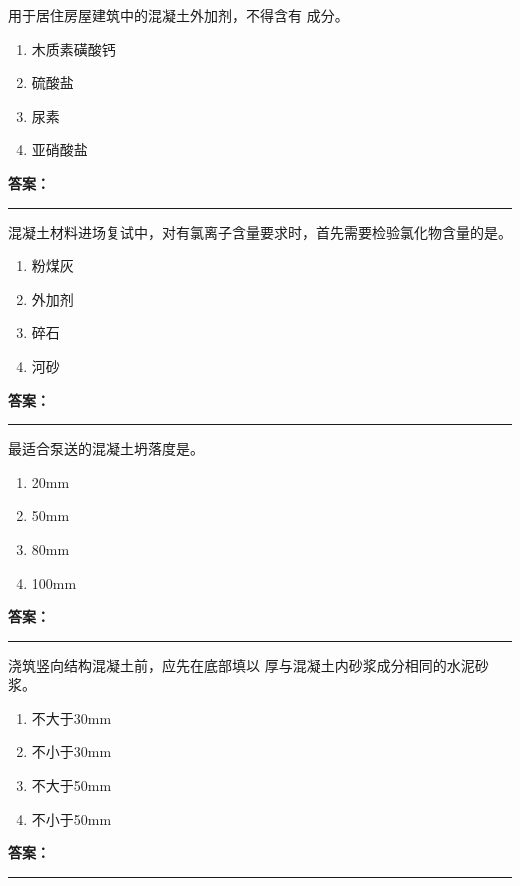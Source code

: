 \documentclass[UTF8,fontset=fandol,11pt]{ctexart}
\newcommand{\answerline}{\textcolor{answerred}{\rule{2.4cm}{0.7pt}}}
\begin{document}
\begin{quizbox}[title={第 69 题}]
用于居住房屋建筑中的混凝土外加剂，不得含有 成分。\\
\begin{enumerate}[label=\Alph*.]
\item 木质素磺酸钙
\item 硫酸盐
\item 尿素
\item 亚硝酸盐
\end{enumerate}
\textbf{\textcolor{answerred}{答案：}} \answerline
\end{quizbox}

\begin{quizbox}[title={第 70 题}]
混凝土材料进场复试中，对有氯离子含量要求时，首先需要检验氯化物含量的是。\\
\begin{enumerate}[label=\Alph*.]
\item 粉煤灰
\item 外加剂
\item 碎石
\item 河砂
\end{enumerate}
\textbf{\textcolor{answerred}{答案：}} \answerline
\end{quizbox}

\begin{quizbox}[title={第 71 题}]
最适合泵送的混凝土坍落度是。\\
\begin{enumerate}[label=\Alph*.]
\item 20mm
\item 50mm
\item 80mm
\item 100mm
\end{enumerate}
\textbf{\textcolor{answerred}{答案：}} \answerline
\end{quizbox}

\begin{quizbox}[title={第 72 题}]
浇筑竖向结构混凝土前，应先在底部填以 厚与混凝土内砂浆成分相同的水泥砂浆。\\
\begin{enumerate}[label=\Alph*.]
\item 不大于30mm
\item 不小于30mm
\item 不大于50mm
\item 不小于50mm
\end{enumerate}
\textbf{\textcolor{answerred}{答案：}} \answerline
\end{quizbox}
\end{document}
